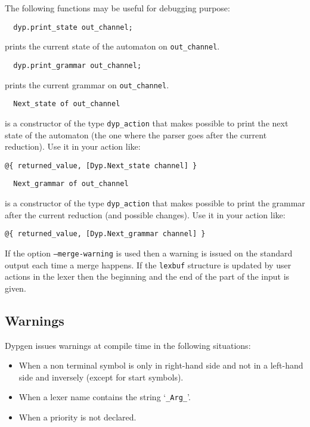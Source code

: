 \documentclass[12pt]{article}
\begin{document}
{The following functions may be useful for debugging purpose:
\begin{verbatim}
  dyp.print_state out_channel;
\end{verbatim}
prints the current state of the automaton on \verb|out_channel|.

\begin{verbatim}
  dyp.print_grammar out_channel;
\end{verbatim}
prints the current grammar on \verb|out_channel|.

\begin{verbatim}
  Next_state of out_channel
\end{verbatim}
is a constructor of the type \verb|dyp_action| that makes possible to print the next state of the automaton (the one where the parser goes after the current reduction). Use it in your action like:
\begin{verbatim}
@{ returned_value, [Dyp.Next_state channel] }
\end{verbatim}

\begin{verbatim}
  Next_grammar of out_channel
\end{verbatim}
is a constructor of the type \verb|dyp_action| that makes possible to print the grammar after the current reduction (and possible changes). Use it in your action like:
\begin{verbatim}
@{ returned_value, [Dyp.Next_grammar channel] }
\end{verbatim}

If the option \texttt{--merge-warning} is used then a warning is issued on the standard output each time a merge happens. If the \texttt{lexbuf} structure is updated by user actions in the lexer then the beginning and the end of the part of the input is given.

\subsection{Warnings}

Dypgen issues warnings at compile time in the following situations:
\begin{itemize}
\item When a non terminal symbol is only in right-hand side and not in a left-hand side and inversely (except for start symbols).
\item When a lexer name contains the string `\verb|_Arg_|'.
\item When a priority is not declared.
\end{itemize}

}
\end{document}
